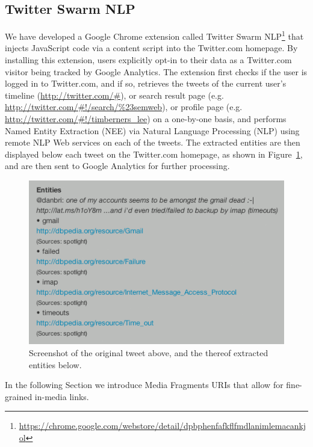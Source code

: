 \documentclass[12pt]{article}
\begin{document}
\subsection{Twitter Swarm NLP}
We have developed a Google Chrome extension called Twitter Swarm NLP\footnote{\url{https://chrome.google.com/webstore/detail/dpbphenfafkflfmdlanimlemacankjol}} that injects JavaScript code via a content script into the Twitter.com homepage. By installing this extension, users explicitly opt-in to their data as a Twitter.com visitor being tracked by Google Analytics. The extension first checks if the user is logged in to Twitter.com, and if so, retrieves the tweets of the current user's timeline (\url{http://twitter.com/#}), or search result page (e.g. \url{http://twitter.com/#!/search/%23semweb}), or profile page (e.g. \url{http://twitter.com/#!/timberners_lee}) on a one-by-one basis, and performs Named Entity Extraction (NEE) via Natural Language Processing (NLP) using remote NLP Web services on each of the tweets. The extracted entities are then displayed below each tweet on the Twitter.com homepage, as shown in Figure~\ref{fig:danbri}, and are then sent to Google Analytics for further processing.

\begin{figure}[htbp!]
\begin{center}
  \includegraphics[width=0.56\linewidth]{./resources/twitter-swarm-nlp-danbri.png}
    \caption{Screenshot of the original tweet above, and the thereof extracted entities below.}
  \label{fig:danbri}
  \end{center}  
\end{figure}

In the following Section we introduce Media Fragments URIs that allow for fine-grained in-media links.
\end{document}
